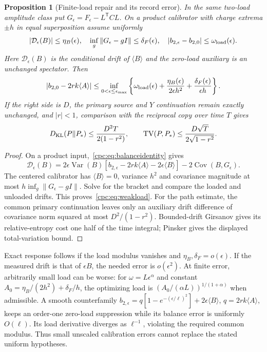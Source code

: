 \documentclass[11pt,oneside,openany]{book}
\newtheorem{proposition}[theorem]{Proposition}
\theoremstyle{definition}
\theoremstyle{remark}\newtheorem{remark}[theorem]{Remark}
\begin{document}
\begin{proposition}[Finite-load repair and its record error]
\label{cpc:prop:weakload}
In the same two-load amplitude class put $G_\epsilon=F_\epsilon-L^{\mathsf T}CL$. On a product calibrator with charge extrema $\pm h$ in equal superposition assume uniformly
\[
 |\mathcal D_\epsilon(B)|\le\eta_B(\epsilon),\quad
 \inf_g\|G_\epsilon-gI\|\le\delta_F(\epsilon),\quad
 |b_{2,\epsilon}-b_{2,0}|\le\omega_{\rm load}(\epsilon).
\]
Here $\mathcal D_\epsilon(B)$ is the conditional drift of $\langle B\rangle$ and the zero-load auxiliary is an unchanged spectator. Then
\begin{equation}
 |b_{2,0}-2rk\langle A\rangle|
 \le\inf_{0<\epsilon\le\epsilon_{\max}}
 \left\{\omega_{\rm load}(\epsilon)+\frac{\eta_B(\epsilon)}{2\epsilon h^2}
 +\frac{\delta_F(\epsilon)}{\epsilon h}\right\}.
 \label{cpc:eq:weakload}
\end{equation}
If the right side is $D$, the primary source and $Y$ continuation remain exactly unchanged, and $|r|<1$, comparison with the reciprocal copy over time $T$ gives
\begin{equation}
 D_{\rm KL}(P\|P_*)\le\frac{D^2T}{2(1-r^2)},\qquad
 \operatorname{TV}(P,P_*)\le\frac{D\sqrt T}{2\sqrt{1-r^2}}.
 \label{cpc:eq:weakloadpath}
\end{equation}
\end{proposition}
\begin{proof}
On a product input,~\eqref{cpc:eq:balanceidentity} gives
\[
 \mathcal D_\epsilon(B)=2\epsilon\operatorname{Var}(B)
 [b_{2,\epsilon}-2rk\langle A\rangle-2\epsilon\langle B\rangle]
 -2\operatorname{Cov}(B,G_\epsilon).
\]
The centered calibrator has $\langle B\rangle=0$, variance $h^2$ and covariance magnitude at most $h\inf_g\|G_\epsilon-gI\|$. Solve for the bracket and compare the loaded and unloaded drifts. This proves~\eqref{cpc:eq:weakload}. For the path estimate, the common primary continuation leaves only an auxiliary drift difference of covariance norm squared at most $D^2/(1-r^2)$. Bounded-drift Girsanov gives its relative-entropy cost one half of the time integral; Pinsker gives the displayed total-variation bound.
\end{proof}

Exact response follows if the load modulus vanishes and $\eta_B,\delta_F=o(\epsilon)$. If the measured drift is that of $\epsilon B$, the needed error is $o(\epsilon^2)$. At finite error, arbitrarily small load can be worse: for $\omega=L\epsilon^\alpha$ and constant $A_0=\eta_B/(2h^2)+\delta_F/h$, the optimizing load is $(A_0/(\alpha L))^{1/(1+\alpha)}$ when admissible. A smooth counterfamily $b_{2,\epsilon}=q[1-e^{-(\epsilon/\ell)^2}]+2\epsilon\langle B\rangle$, $q=2rk\langle A\rangle$, keeps an order-one zero-load suppression while its balance error is uniformly $O(\ell)$. Its load derivative diverges as $\ell^{-1}$, violating the required common modulus. Thus small unscaled calibration errors cannot replace the stated uniform hypotheses.
\end{document}
